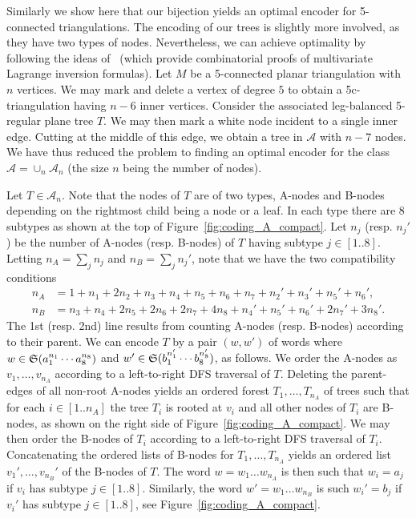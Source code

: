 \documentclass[letter]{amsart}
\numberwithin{theo}{section}
\theoremstyle{remark}
\def\cA{\mathcal{A}}
\begin{document}
Similarly we show here that our bijection yields an optimal encoder for 5-connected triangulations. The encoding of our trees is slightly more involved, as they have two types of nodes.  
Nevertheless, we can achieve optimality by following the ideas of~\cite{chottin1975demonstration,chottin1981enumeration,bacher2013multivariate} (which provide combinatorial proofs of multivariate Lagrange inversion formulas). Let $M$ be a 5-connected planar triangulation with $n$ vertices. We may mark and delete a vertex of degree $5$ to obtain a 5c-triangulation having $n-6$ inner vertices. Consider the associated leg-balanced 5-regular plane tree $T$. We may then mark a white node incident to a single inner edge. Cutting at the middle of this edge, we obtain a tree in $\cA$ with $n-7$ nodes. We have thus reduced the problem to finding an optimal encoder for the class $\cA=\cup_n\cA_n$ (the size $n$ being the number of nodes). 

Let $T\in\cA_n$. Note that the nodes of $T$ are of two types, A-nodes and B-nodes depending on the rightmost child being a node or a leaf. In each type there are 8 subtypes as shown at the top of  Figure~\ref{fig:coding_A_compact}. Let $n_j$ (resp. $n_j'$) be the number of A-nodes (resp. B-nodes) of $T$ having subtype $j\in[1..8]$. Letting $n_A=\sum_jn_j$ and $n_B=\sum_jn_j'$, note that we have the two compatibility conditions 
\begin{align*}
n_A&=1+n_1+2n_2+n_3+n_4+n_5+n_6+n_7+n_2'+n_3'+n_5'+n_6',\\
n_B&=n_3+n_4+2n_5+2n_6+2n_7+4n_8+n_4'+n_5'+n_6'+2n_7'+3n_8'.
\end{align*}
The 1st (resp. 2nd) line results from counting A-nodes (resp. B-nodes) according to their parent.   
We can encode $T$ by a pair $(w,w')$ of words where $w\in\frak{S}(a_1^{n_1}\cdots a_8^{n_8})$
and $w'\in\frak{S}(b_1^{n_1'}\cdots b_8^{n_8'})$, as follows. We order the A-nodes as $v_1,\ldots,v_{n_A}$ according to a left-to-right DFS traversal of $T$. Deleting the parent-edges of all non-root A-nodes yields an ordered forest $T_1,\ldots,T_{n_A}$ of trees such that  for each $i\in[1..n_A]$ the tree $T_i$ is rooted at $v_i$ and all other nodes of $T_i$ are B-nodes, as shown on the right side of Figure~\ref{fig:coding_A_compact}. We may then order the B-nodes of $T_i$ according to a left-to-right DFS traversal of $T_i$. Concatenating the ordered lists of B-nodes for $T_1,\ldots,T_{n_A}$ yields an ordered list $v_1',\ldots,v_{n_B}'$ of the B-nodes of $T$. The word $w=w_1\ldots w_{n_A}$ is then such that $w_i=a_j$ if $v_i$ has subtype $j\in[1..8]$. Similarly, the word $w'=w_1\ldots w_{n_B}$ is such $w_i'=b_j$ if $v_i'$ has subtype $j\in[1..8]$, see Figure~\ref{fig:coding_A_compact}. 
\end{document}
